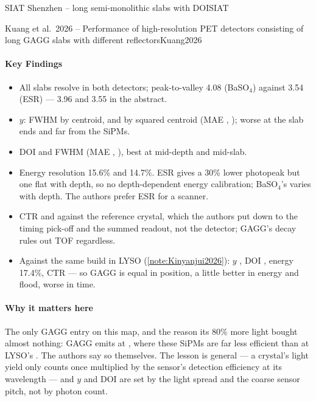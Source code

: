 \begin{programnote}{SIAT Shenzhen -- long semi-monolithic slabs with DOI}{SIAT}
\begin{papernote}{Kuang et al.\ 2026 -- Performance of high-resolution PET detectors consisting of long GAGG slabs with different reflectors}{Kuang2026}
\paragraph{Key Findings}
\begin{itemize}
	\item All  slabs resolve in both detectors; peak-to-valley 4.08
		(BaSO$_4$) against 3.54 (ESR) --- 3.96 and 3.55 in the abstract.
	\item $y$:  FWHM by centroid,  and  by squared
		centroid (MAE , ); worse at the slab ends and far
		from the SiPMs.
	\item DOI  and  FWHM (MAE , ), best at
		mid-depth and mid-slab.
	\item Energy resolution 15.6\% and 14.7\%. ESR gives a 30\% lower photopeak
		but one flat with depth, so no depth-dependent energy calibration;
		BaSO$_4$'s varies with depth. The authors prefer ESR for a scanner.
	\item CTR  and  against the reference crystal, which the
		authors put down to the timing pick-off and the summed readout, not the
		detector; GAGG's  decay rules out TOF regardless.
	\item Against the same build in LYSO (\ref{note:Kinyanjui2026}): $y$ , DOI , energy 17.4\%, CTR
		 --- so GAGG is equal in position, a little better in energy
		and flood, worse in time.
\end{itemize}

\paragraph{Why it matters here}
The only GAGG entry on this map, and the reason its 80\% more light bought
almost nothing: GAGG emits at , where these SiPMs are far less
efficient than at LYSO's . The authors say so themselves. The lesson
is general --- a crystal's light yield only counts once multiplied by the
sensor's detection efficiency at its wavelength --- and $y$ and DOI are set by
the light spread and the coarse  sensor pitch, not by photon count.


\end{papernote}
\end{programnote}
